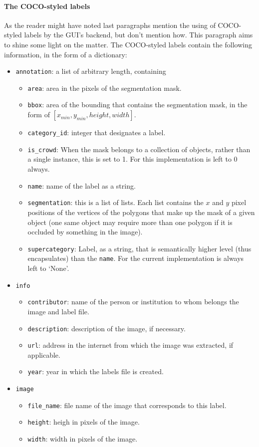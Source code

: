 \documentclass[../main.tex]{subfiles}
\begin{document}
\paragraph{The COCO-styled labels}
As the reader might have noted last paragraphs mention the using of COCO-styled labels by the GUI's backend, but don't mention how. This paragraph aims to shine some light on the matter. The COCO-styled labels contain the following information, in the form of a dictionary:
\begin{itemize}
    \item \texttt{annotation}: a list of arbitrary length, containing
    \begin{itemize}
        \item \texttt{area}: area in the pixels of the segmentation mask.
        \item \texttt{bbox}: area of the bounding that contains the segmentation mask, in the form of $[x_{min}, y_{min}, height, width]$.
        \item \texttt{category\_id}: integer that designates a label.
        \item \texttt{is\_crowd}: When the mask belongs to a collection of objects, rather than a single instance, this is set to 1. For this implementation is left to 0 always.
        \item \texttt{name}: name of the label as a string.
        \item \texttt{segmentation}: this is a list of lists. Each list contains the $x$ and $y$ pixel positions of the vertices of the polygons that make up the mask of a given object (one same object may require more than one polygon if it is occluded by something in the image).
        \item \texttt{supercategory}: Label, as a string, that is semantically higher level (thus encapsulates) than the \texttt{name}. For the current implementation is always left to `None'.
    \end{itemize}
    \item \texttt{info}
    \begin{itemize}
        \item \texttt{contributor}: name of the person or institution to whom belongs the image and label file.
        \item \texttt{description}: description of the image, if necessary.
        \item \texttt{url}: address in the internet from which the image was extracted, if applicable.
        \item \texttt{year}: year in which the labels file is created.
    \end{itemize}
    \item \texttt{image}
    \begin{itemize}
        \item \texttt{file\_name}: file name of the image that corresponds to this label.
        \item \texttt{height}: heigh in pixels of the image.
        \item \texttt{width}: width in pixels of the image.
    \end{itemize}
\end{itemize}
\end{document}
